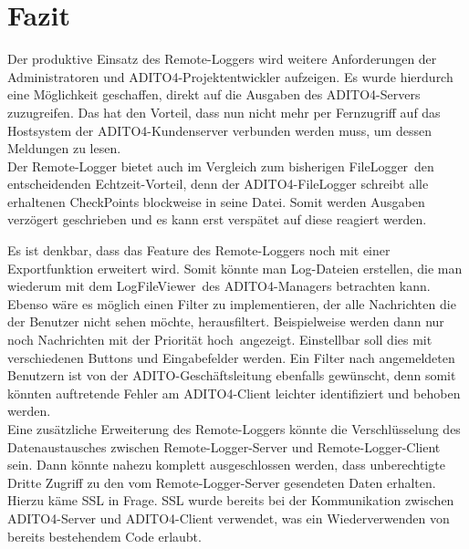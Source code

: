 \section{Fazit}
\par Der produktive Einsatz des Remote-Loggers wird weitere Anforderungen der Administratoren und ADITO4-Projektentwickler aufzeigen. Es wurde hierdurch eine Möglichkeit geschaffen, direkt auf die Ausgaben des ADITO4-Servers zuzugreifen. Das hat den Vorteil, dass nun nicht mehr per Fernzugriff auf das Hostsystem der ADITO4-Kundenserver verbunden werden muss, um dessen Meldungen zu lesen. \\
Der Remote-Logger bietet auch im Vergleich zum bisherigen \glqq FileLogger\grqq\ den entscheidenden Echtzeit-Vorteil, denn der ADITO4-FileLogger schreibt alle erhaltenen CheckPoints blockweise in seine Datei. Somit werden Ausgaben verzögert geschrieben und es kann erst verspätet auf diese reagiert werden.

\par Es ist denkbar, dass das Feature des Remote-Loggers noch mit einer Exportfunktion erweitert wird. Somit könnte man Log-Dateien erstellen, die man wiederum mit dem \glqq LogFileViewer\grqq\ des ADITO4-Managers betrachten kann. \\
Ebenso wäre es möglich einen Filter zu implementieren, der alle Nachrichten die der Benutzer nicht sehen möchte, herausfiltert. Beispielweise werden dann nur noch Nachrichten mit der Priorität \glqq hoch\grqq\ angezeigt. Einstellbar soll dies mit verschiedenen Buttons und Eingabefelder werden. Ein Filter nach angemeldeten Benutzern ist von der ADITO-Geschäftsleitung ebenfalls gewünscht, denn somit könnten auftretende Fehler am ADITO4-Client leichter identifiziert und behoben werden. \\
Eine zusätzliche Erweiterung des Remote-Loggers könnte die Verschlüsselung des Datenaustausches zwischen Remote-Logger-Server und Remote-Logger-Client sein. Dann könnte nahezu komplett ausgeschlossen werden, dass unberechtigte Dritte Zugriff zu den vom Remote-Logger-Server gesendeten Daten erhalten. Hierzu käme SSL in Frage. SSL wurde bereits bei der Kommunikation zwischen ADITO4-Server und ADITO4-Client verwendet, was ein Wiederverwenden von bereits bestehendem Code erlaubt.
